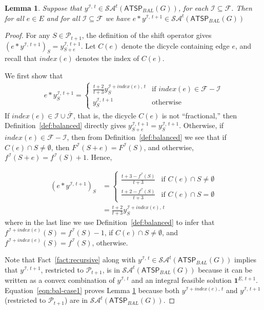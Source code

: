 \documentclass[11pt]{article}
\newtheorem{lemma}[theorem]{Lemma}
\newcommand{\pop}{\mathcal{P}}
\newcommand{\atspbal}{\homog{\textsf{ATSP$_{\mathit{BAL}}$}}}
\newcommand{\fracset}{\mathcal{F}}
\newcommand{\notfracset}{\overline{\mathcal{F}}}
\newcommand{\sgn}{\mathcal{I}}
\newcommand{\yvec}[2]{y^{#1,\,#2}}	\newcommand{\zvec}[2]{y^{#1,\,#2}}	\newcommand{\zveconly}{y}
\newcommand{\onevec}[2]{\textbf{1}^{#1,\,#2}}		\newcommand{\goodfrac}[2]{F^{#1}(#2)}	\newcommand{\szgoodfrac}[2]{f^{#1}(#2)}	\newcommand{\cindex}[1]{\textit{index}(#1)} \newcommand{\indfrac}{h}	\newcommand{\tour}{\textit{tour\/}}
\newcommand{\saop}{\mathcal{SA}}
\newcommand{\homog}[1]{{#1}}
\begin{document}
\begin{lemma}
\label{lemma:cond1}
Suppose that $\yvec{\sgn}{t} \in \saop^t(\homog{\atspbal(G)})$,
for each $\sgn\subseteq\fracset$.
Then for all $e\in E$ and for all $\sgn\subseteq\fracset$ we have
$ \displaystyle
	e*\yvec{\sgn}{t+1}  \in \saop^t(\homog{\atspbal(G)})$
\end{lemma}
\begin{proof}
For any $S \in \pop_{t+1}$, the definition of the shift operator gives
$\displaystyle 
	(e*\yvec{\sgn}{t+1})_S = \yvec{\sgn}{t+1}_{S+e}.
$
Let $C(e)$ denote the dicycle containing edge $e$, and recall
that $\cindex{e}$ denotes the index of $C(e)$.

We first show that
\begin{align}
\label{eqn:bal-case1}
 e*\yvec{\sgn}{t+1}_S =
 \begin{cases}
  \frac{t+2}{t+3} \yvec{\sgn+\cindex{e}}{t}_S
	&\text{if } \cindex{e} \in \fracset - \sgn \\
  \yvec{\sgn}{t+1}_S	&\text{otherwise}
 \end{cases}
\end{align}
If $\cindex{e} \in \sgn \cup \notfracset$, that is, the dicycle $C(e)$
is not ``fractional,'' then Definition~\ref{def:balanced} directly
gives $\yvec{\sgn}{t+1}_{S+e} = \yvec{\sgn}{t+1}_S$.
Otherwise, if $\cindex{e} \in \fracset-\sgn$, then
from Definition~\ref{def:balanced} we see that
if $C(e)\cap S\neq \emptyset$, then
$\goodfrac{\sgn}{S+{e}} = \goodfrac{\sgn}{S}$,
and otherwise,
$\szgoodfrac{\sgn}{S+{e}} = \szgoodfrac{\sgn}{S} + 1$.
Hence,

\begin{align}
 (e*\yvec{\sgn}{t+1})_S & =
 \begin{cases}
  \frac{t+3 - \szgoodfrac{\sgn}{S}}{t+3}  &\text{if } C(e)\cap S\neq \emptyset \\
  \frac{t+2 - \szgoodfrac{\sgn}{S}}{t+3}  &\text{if } C(e)\cap S=\emptyset
 \end{cases} \label{eqn:shift} \\
 &= \frac{t+2}{t+3} \yvec{\sgn+\cindex{e}}{t}_S
\end{align}
where in the last line we use Definition~\ref{def:balanced} to infer
that
 $\szgoodfrac{\sgn+\cindex{e}}{S} = \szgoodfrac{\sgn}{S} - 1$, if
$C(e)\cap S\neq \emptyset$, and
 $\szgoodfrac{\sgn+\cindex{e}}{S} = \szgoodfrac{\sgn}{S}$, otherwise.

Note that Fact~\ref{fact:recursive} along with $\yvec{\sgn}{t} \in
\saop^t(\homog{\atspbal(G)})$ implies that
$\yvec{\sgn}{t+1}$, restricted to $\pop_{t+1}$,
is in $\saop^t(\homog{\atspbal(G)})$ because
it can be written as a convex combination of $\yvec{\sgn}{t}$ and an
integral feasible solution $\onevec{E}{t+1}$.
Equation~\eqref{eqn:bal-case1} proves Lemma \ref{lemma:cond1} because
both $\yvec{\sgn+\cindex{e}}{t}$ and
$\yvec{\sgn}{t+1}$ (restricted to $\pop_{t+1}$) are in
$\saop^t(\homog{\atspbal(G)})$.
 \end{proof}
\end{document}
